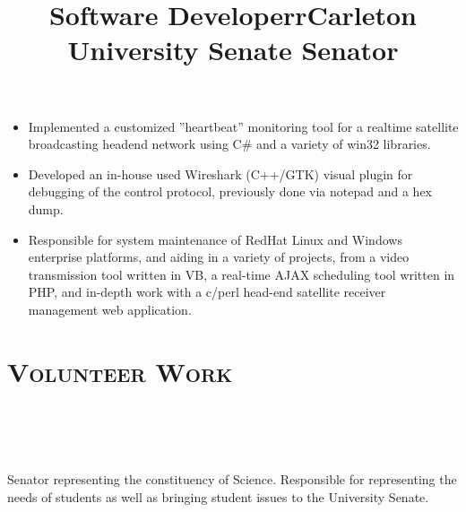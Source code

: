 \begin{resume}
\title{Software Developer}
\begin{position}
\begin{itemize}
\item Implemented a customized ''heartbeat'' monitoring tool for a realtime satellite broadcasting headend network using C\# and a variety of win32 libraries.
\item Developed an in-house used Wireshark (C++/GTK) visual plugin for debugging of the control protocol, previously done via notepad and a hex dump.
\item Responsible for system maintenance of RedHat Linux and Windows enterprise platforms, and aiding in a variety of projects, from a video transmission tool written in VB, a real-time AJAX scheduling tool written in PHP, and in-depth work with a c/perl head-end satellite receiver management web application.
\end{itemize}
\end{position}


\section{\textsc{Volunteer Work}}
\begin{formatb}
	\title{r}\\
	\\
	\body\\
\end{formatb}

\title{Carleton University Senate Senator }
\begin{position}
Senator representing the constituency of Science. Responsible for representing the needs of students as well as bringing student issues to the University Senate.
\end{position}
 

\end{resume}
